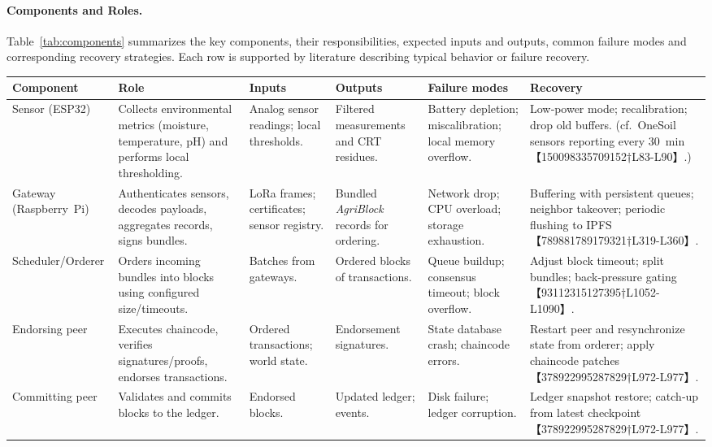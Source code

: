 \paragraph{Components and Roles.}
Table~\ref{tab:components} summarizes the key components, their responsibilities, expected inputs and outputs, common failure modes and corresponding recovery strategies.  Each row is supported by literature describing typical behavior or failure recovery.

\begin{table*}[!t]
  \centering
  \caption{System components and their roles, inputs, outputs, and failure handling.}
  \label{tab:components}
  \begin{tabular}{p{2.5cm}p{3cm}p{2.7cm}p{2.7cm}p{3cm}p{3cm}}
    \toprule
    \textbf{Component} & \textbf{Role} & \textbf{Inputs} & \textbf{Outputs} & \textbf{Failure modes} & \textbf{Recovery} \\
    \midrule
    Sensor (ESP32) & Collects environmental metrics (moisture, temperature, pH) and performs local thresholding. & Analog sensor readings; local thresholds. & Filtered measurements and CRT residues. & Battery depletion; miscalibration; local memory overflow. & Low‑power mode; recalibration; drop old buffers.  (cf.~OneSoil sensors reporting every 30~min【150098335709152†L83-L90】.) \\
    Gateway (Raspberry~Pi) & Authenticates sensors, decodes payloads, aggregates records, signs bundles. & LoRa frames; certificates; sensor registry. & Bundled \emph{AgriBlock} records for ordering. & Network drop; CPU overload; storage exhaustion. & Buffering with persistent queues; neighbor takeover; periodic flushing to IPFS【789881789179321†L319-L360】. \\
    Scheduler/Orderer & Orders incoming bundles into blocks using configured size/timeouts. & Batches from gateways. & Ordered blocks of transactions. & Queue buildup; consensus timeout; block overflow. & Adjust block timeout; split bundles; back‑pressure gating【93112315127395†L1052-L1090】. \\
    Endorsing peer & Executes chaincode, verifies signatures/proofs, endorses transactions. & Ordered transactions; world state. & Endorsement signatures. & State database crash; chaincode errors. & Restart peer and resynchronize state from orderer; apply chaincode patches【378922995287829†L972-L977】. \\
    Committing peer & Validates and commits blocks to the ledger. & Endorsed blocks. & Updated ledger; events. & Disk failure; ledger corruption. & Ledger snapshot restore; catch‑up from latest checkpoint【378922995287829†L972-L977】. \\

\end{tabular}
\end{table*}
